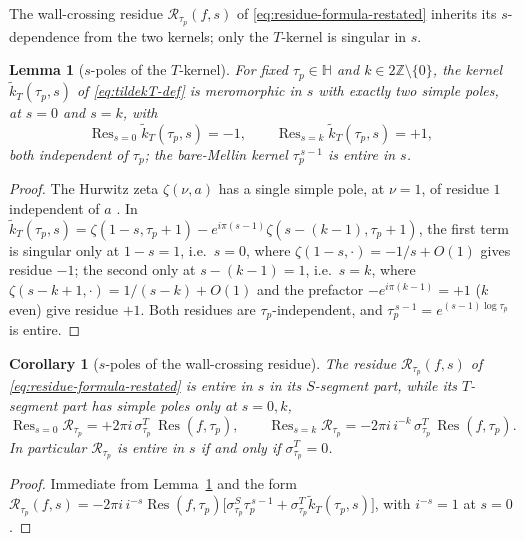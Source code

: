 \documentclass[11pt]{article}
\newtheorem{lemma}[theorem]{Lemma}
\newtheorem{corollary}[theorem]{Corollary}
\numberwithin{equation}{section}  %
\newcommand{\HH}{\mathbb{H}}
\newcommand{\ZZ}{\mathbb{Z}}
\DeclareMathOperator{\Res}{Res}
\begin{document}
The wall-crossing residue $\mathcal{R}_{\tau_p}(f, s)$ of
\eqref{eq:residue-formula-restated} inherits its $s$-dependence from the
two kernels; only the $T$-kernel is singular in $s$.

\begin{lemma}[$s$-poles of the $T$-kernel]\label{lem:kT-spoles}
For fixed $\tau_p \in \HH$ and $k \in 2\ZZ \setminus \{0\}$, the kernel
$\widetilde{k}_T(\tau_p, s)$ of \eqref{eq:tildekT-def} is meromorphic in
$s$ with exactly two simple poles, at $s = 0$ and $s = k$, with
\begin{equation}\label{eq:kT-spole-residues}
  \Res_{s=0}\widetilde{k}_T(\tau_p, s) = -1,
  \qquad
  \Res_{s=k}\widetilde{k}_T(\tau_p, s) = +1,
\end{equation}
both independent of $\tau_p$; the bare-Mellin kernel $\tau_p^{\,s-1}$ is
entire in $s$.
\end{lemma}
\begin{proof}
The Hurwitz zeta $\zeta(\nu, a)$ has a single simple pole, at $\nu = 1$,
of residue $1$ independent of $a$ \cite[\S25.11]{DLMF}.  In
$\widetilde{k}_T(\tau_p, s) = \zeta(1 - s, \tau_p + 1) - e^{i\pi(s-1)}\zeta(s - (k - 1), \tau_p + 1)$,
the first term is singular only at $1 - s = 1$, i.e.\ $s = 0$, where
$\zeta(1 - s, \cdot) = -1/s + O(1)$ gives residue $-1$; the second only
at $s - (k - 1) = 1$, i.e.\ $s = k$, where
$\zeta(s - k + 1, \cdot) = 1/(s - k) + O(1)$ and the prefactor
$-e^{i\pi(k-1)} = +1$ ($k$ even) give residue $+1$.  Both residues are
$\tau_p$-independent, and $\tau_p^{\,s-1} = e^{(s-1)\log\tau_p}$ is
entire.
\end{proof}

\begin{corollary}[$s$-poles of the wall-crossing residue]\label{cor:R-spoles}
The residue $\mathcal{R}_{\tau_p}(f, s)$ of
\eqref{eq:residue-formula-restated} is entire in $s$ in its $S$-segment
part, while its $T$-segment part has simple poles only at $s = 0, k$,
\begin{equation}\label{eq:R-spole-residues}
  \Res_{s=0}\mathcal{R}_{\tau_p} = +2\pi i\,\sigma^T_{\tau_p}\,\Res(f, \tau_p),
  \qquad
  \Res_{s=k}\mathcal{R}_{\tau_p} = -2\pi i\,i^{-k}\,\sigma^T_{\tau_p}\,\Res(f, \tau_p).
\end{equation}
In particular $\mathcal{R}_{\tau_p}$ is entire in $s$ if and only if
$\sigma^T_{\tau_p} = 0$.
\end{corollary}
\begin{proof}
Immediate from Lemma~\ref{lem:kT-spoles} and the form
$\mathcal{R}_{\tau_p}(f, s) = -2\pi i\,i^{-s}\Res(f, \tau_p)\bigl[\sigma^S_{\tau_p}\tau_p^{\,s-1} + \sigma^T_{\tau_p}\widetilde{k}_T(\tau_p, s)\bigr]$,
with $i^{-s} = 1$ at $s = 0$.
\end{proof}
\end{document}
